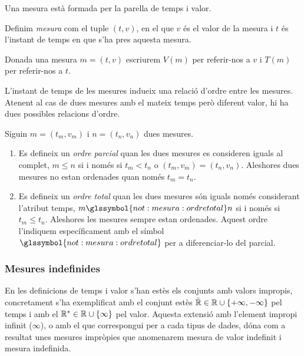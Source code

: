 Una mesura està formada per la parella de temps i valor.

\begin{definition}[Mesura]
  \label{def:model:mesura}
  Definim \emph{mesura} com el tuple $(t,v)$, en el que $v$ és el
  valor de la mesura i $t$ és l'instant de temps en que s'ha pres
  aquesta mesura.
\end{definition}


Donada una mesura $m=(t,v)$ escriurem $V(m)$ per referir-nos a $v$ i
$T(m)$ per referir-nos a $t$.


L'instant de temps de les mesures indueix una relació d'ordre
entre les mesures. Atenent al cas de dues mesures amb el mateix temps
però diferent valor, hi ha dues possibles relacions d'ordre.
\begin{definition}
  \label{def:model:mesura-relacio-ordre}
  Siguin $m=(t_m,v_m)$ i $n=(t_n,v_n)$ dues mesures.

  \begin{enumerate}
  \item Es defineix un \emph{ordre parcial} quan les dues mesures es
    consideren iguals al complet, $m \leq n$ si i només si $t_m < t_n$
    o $(t_m, v_m) = (t_n, v_n)$. Aleshores dues mesures no estan
    ordenades quan només $t_m = t_n$.

  \item Es defineix un \emph{ordre total} quan les dues mesures són
    iguals només considerant l'atribut temps,
    $m\glssymbol{not:mesura:ordretotal} n$ si i només si $t_m\leq
    t_n$. Aleshores les mesures sempre estan ordenades.  Aquest ordre
    l'indiquem específicament amb el símbol
    $\glssymbol{not:mesura:ordretotal}$ per a diferenciar-lo del
    parcial.
  \end{enumerate}

\end{definition}






\subsubsection{Mesures indefinides}



En les definicions de temps i valor s'han estès els conjunts amb
valors impropis, concretament s'ha exemplificat amb el conjunt estès
 $\bar{\mathbb{R}{}} \in \mathbb{R}{} \cup \{+\infty,-\infty\}$
pel temps i amb el $\mathbb{R}{}^*\in\mathbb{R}{} \cup\{\infty\}$ pel
valor. Aquesta extensió amb l'element impropi infinit ($\infty$), o
amb el que correspongui per a cada tipus de dades, dóna com a resultat
unes mesures impròpies que anomenarem mesura de valor indefinit i
mesura indefinida.

